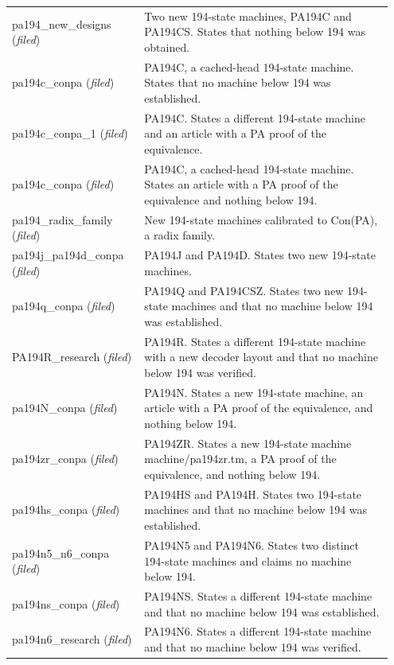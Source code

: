 \begin{longtable}{@{}p{0.33\linewidth}p{0.62\linewidth}@{}}
pa194\_\allowbreak{}new\_\allowbreak{}designs (\emph{filed}) & Two new 194-state machines, PA194C and PA194CS. States that nothing below 194 was obtained. \\
pa194c\_\allowbreak{}conpa (\emph{filed}) & PA194C, a cached-head 194-state machine. States that no machine below 194 was established. \\
pa194c\_\allowbreak{}conpa\_\allowbreak{}1 (\emph{filed}) & PA194C. States a different 194-state machine and an article with a PA proof of the equivalence. \\
pa194c\_\allowbreak{}conpa (\emph{filed}) & PA194C, a cached-head 194-state machine. States an article with a PA proof of the equivalence and nothing below 194. \\
pa194\_\allowbreak{}radix\_\allowbreak{}family (\emph{filed}) & New 194-state machines calibrated to Con(PA), a radix family. \\
pa194j\_\allowbreak{}pa194d\_\allowbreak{}conpa (\emph{filed}) & PA194J and PA194D. States two new 194-state machines. \\
pa194q\_\allowbreak{}conpa (\emph{filed}) & PA194Q and PA194CSZ. States two new 194-state machines and that no machine below 194 was established. \\
PA194R\_\allowbreak{}research (\emph{filed}) & PA194R. States a different 194-state machine with a new decoder layout and that no machine below 194 was verified. \\
pa194N\_\allowbreak{}conpa (\emph{filed}) & PA194N. States a new 194-state machine, an article with a PA proof of the equivalence, and nothing below 194. \\
pa194zr\_\allowbreak{}conpa (\emph{filed}) & PA194ZR. States a new 194-state machine machine/pa194zr.tm, a PA proof of the equivalence, and nothing below 194. \\
pa194hs\_\allowbreak{}conpa (\emph{filed}) & PA194HS and PA194H. States two 194-state machines and that no machine below 194 was established. \\
pa194n5\_\allowbreak{}n6\_\allowbreak{}conpa (\emph{filed}) & PA194N5 and PA194N6. States two distinct 194-state machines and claims no machine below 194. \\
pa194ns\_\allowbreak{}conpa (\emph{filed}) & PA194NS. States a different 194-state machine and that no machine below 194 was established. \\
pa194n6\_\allowbreak{}research (\emph{filed}) & PA194N6. States a different 194-state machine and that no machine below 194 was verified. \\

\end{longtable}
